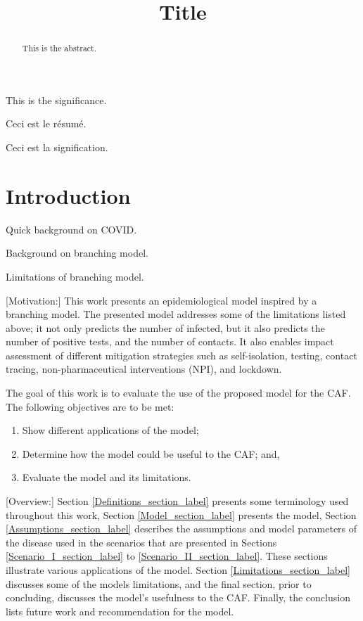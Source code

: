 \documentclass[sr]{drdc-report}
\title{Title}
\begin{document}
 \makefrontcover

 \begin{abstract}
This is the abstract.
 \end{abstract}

 \begin{significance}
This is the significance.
 \end{significance}

 \begin{fabstract}
Ceci est le r\'esum\'e.
 \end{fabstract}

 \begin{fsignificance}
Ceci est la signification.

 \end{fsignificance}

 \tableofcontents\clearpage
 \listoffigures
 \listoftables


\section{Introduction}
Quick background on COVID.

Background on branching model.

Limitations of branching model.

[Motivation:] This work presents an epidemiological model inspired by a branching model\cite{bm}. The presented model addresses some of the limitations listed above; it not only predicts the number of infected, but it also predicts the number of positive tests, and the number of contacts. It also enables impact assessment of different mitigation strategies such as self-isolation, testing, contact tracing, non-pharmaceutical interventions (NPI), and lockdown.

The goal of this work is to evaluate the use of the proposed model for the CAF. The following objectives are to be met:
\begin{enumerate}
\item Show different applications of the model;
\item Determine how the model could be useful to the CAF; and,
\item Evaluate the model and its limitations.
\end{enumerate}

[Overview:] Section \ref{Definitions_section_label} presents some terminology used throughout this work, Section \ref{Model_section_label} presents the model, Section \ref{Assumptions_section_label} describes the assumptions and model parameters of the disease used in the scenarios that are presented in Sections \ref{Scenario_I_section_label} to \ref{Scenario_II_section_label}. These sections illustrate various applications of the model. Section \ref{Limitations_section_label} discusses some of the models limitations, and the final section, prior to concluding, discusses the model's usefulness to the CAF. Finally, the conclusion lists future work and recommendation for the model.
\end{document}
